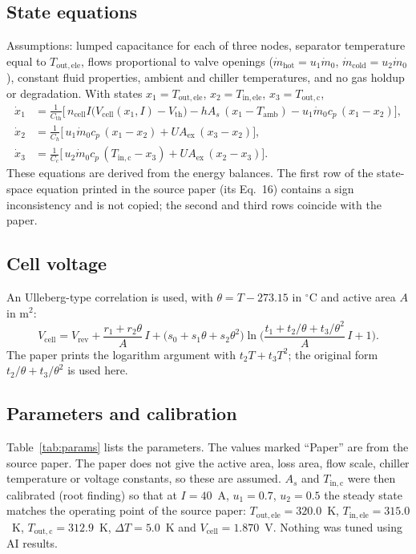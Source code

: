 \documentclass[11pt,a4paper]{article}
\newcommand{\Tout}{T_{\mathrm{out,ele}}}
\newcommand{\Tin}{T_{\mathrm{in,ele}}}
\newcommand{\Tc}{T_{\mathrm{out,c}}}
\newcommand{\Vcell}{V_{\mathrm{cell}}}
\newcommand{\dT}{\Delta T}
\begin{document}
\subsection{State equations}
Assumptions: lumped capacitance for each of three nodes, separator temperature equal to $\Tout$, flows proportional to valve openings ($\dot m_{\mathrm{hot}}=u_1\dot m_0$, $\dot m_{\mathrm{cold}}=u_2\dot m_0$), constant fluid properties, ambient and chiller temperatures, and no gas holdup or degradation. With states $x_1=\Tout$, $x_2=\Tin$, $x_3=\Tc$,
\begin{align}
\dot x_1 &= \frac{1}{C_{\mathrm{th}}}\Big[\, n_{\mathrm{cell}} I\big(\Vcell(x_1,I)-V_{\mathrm{th}}\big) - hA_s\,(x_1-T_{\mathrm{amb}}) - u_1\dot m_0 c_p\,(x_1-x_2)\Big],\\
\dot x_2 &= \frac{1}{C_{h}}\Big[\, u_1\dot m_0 c_p\,(x_1-x_2) + UA_{\mathrm{ex}}\,(x_3-x_2)\Big],\\
\dot x_3 &= \frac{1}{C_{c}}\Big[\, u_2\dot m_0 c_p\,(T_{\mathrm{in,c}}-x_3) + UA_{\mathrm{ex}}\,(x_2-x_3)\Big].
\end{align}
These equations are derived from the energy balances. The first row of the state-space equation printed in the source paper (its Eq.~16) contains a sign inconsistency and is not copied; the second and third rows coincide with the paper.

\subsection{Cell voltage}
An Ulleberg-type correlation \cite{ulleberg2003} is used, with $\theta=T-273.15$ in $^\circ$C and active area $A$ in m$^2$:
\begin{equation}
\Vcell = V_{\mathrm{rev}} + \frac{r_1+r_2\theta}{A}\,I + \big(s_0+s_1\theta+s_2\theta^2\big)\ln\!\Big(\frac{t_1+t_2/\theta+t_3/\theta^2}{A}\,I+1\Big).
\end{equation}
The paper prints the logarithm argument with $t_2T+t_3T^2$; the original form $t_2/\theta+t_3/\theta^2$ is used here.

\subsection{Parameters and calibration}
Table~\ref{tab:params} lists the parameters. The values marked ``Paper'' are from the source paper. The paper does not give the active area, loss area, flow scale, chiller temperature or voltage constants, so these are assumed. $A_s$ and $T_{\mathrm{in,c}}$ were then calibrated (root finding) so that at $I=40$~A, $u_1=0.7$, $u_2=0.5$ the steady state matches the operating point of the source paper: $\Tout=320.0$~K, $\Tin=315.0$~K, $\Tc=312.9$~K, $\dT=5.0$~K and $\Vcell=1.870$~V. Nothing was tuned using AI results.
\end{document}
